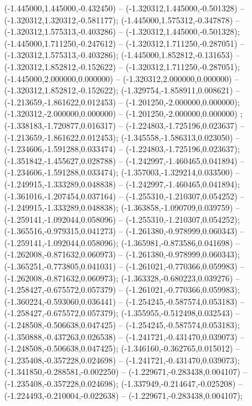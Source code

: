  (-1.445000,1.445000,-0.432450) -- (-1.320312,1.445000,-0.501328) -- (-1.320312,1.320312,-0.581177);
 (-1.445000,1.575312,-0.347878) -- (-1.320312,1.575313,-0.403286) -- (-1.320312,1.445000,-0.501328);
 (-1.445000,1.711250,-0.247612) -- (-1.320312,1.711250,-0.287051) -- (-1.320312,1.575313,-0.403286);
 (-1.445000,1.852812,-0.131653) -- (-1.320312,1.852812,-0.152622) -- (-1.320312,1.711250,-0.287051);
 (-1.445000,2.000000,0.000000) -- (-1.320312,2.000000,0.000000) -- (-1.320312,1.852812,-0.152622);
 (-1.329754,-1.858911,0.008621) -- (-1.213659,-1.861622,0.012453) -- (-1.201250,-2.000000,0.000000);
 (-1.320312,-2.000000,0.000000) -- (-1.201250,-2.000000,0.000000) ;
 (-1.338183,-1.720877,0.016317) -- (-1.224803,-1.725196,0.023637) -- (-1.213659,-1.861622,0.012453);
 (-1.345558,-1.586313,0.023050) -- (-1.234606,-1.591288,0.033474) -- (-1.224803,-1.725196,0.023637);
 (-1.351842,-1.455627,0.028788) -- (-1.242997,-1.460465,0.041894) -- (-1.234606,-1.591288,0.033474);
 (-1.357003,-1.329214,0.033500) -- (-1.249915,-1.333289,0.048838) -- (-1.242997,-1.460465,0.041894);
 (-1.361016,-1.207454,0.037164) -- (-1.255310,-1.210307,0.054252) -- (-1.249915,-1.333289,0.048838);
 (-1.363858,-1.090709,0.039759) -- (-1.259141,-1.092044,0.058096) -- (-1.255310,-1.210307,0.054252);
 (-1.365516,-0.979315,0.041273) -- (-1.261380,-0.978999,0.060343) -- (-1.259141,-1.092044,0.058096);
 (-1.365981,-0.873586,0.041698) -- (-1.262008,-0.871632,0.060973) -- (-1.261380,-0.978999,0.060343);
 (-1.365251,-0.773805,0.041031) -- (-1.261021,-0.770366,0.059983) -- (-1.262008,-0.871632,0.060973);
 (-1.363328,-0.680223,0.039276) -- (-1.258427,-0.675572,0.057379) -- (-1.261021,-0.770366,0.059983);
 (-1.360224,-0.593060,0.036441) -- (-1.254245,-0.587574,0.053183) -- (-1.258427,-0.675572,0.057379);
 (-1.355955,-0.512498,0.032543) -- (-1.248508,-0.506638,0.047425) -- (-1.254245,-0.587574,0.053183);
 (-1.350888,-0.437263,0.026538) -- (-1.241721,-0.431470,0.039073) -- (-1.248508,-0.506638,0.047425);
 (-1.346160,-0.362765,0.015012) -- (-1.235408,-0.357228,0.024698) -- (-1.241721,-0.431470,0.039073);
 (-1.341850,-0.288581,-0.002250) -- (-1.229671,-0.283438,0.004107) -- (-1.235408,-0.357228,0.024698);
 (-1.337949,-0.214647,-0.025208) -- (-1.224493,-0.210004,-0.022638) -- (-1.229671,-0.283438,0.004107);
